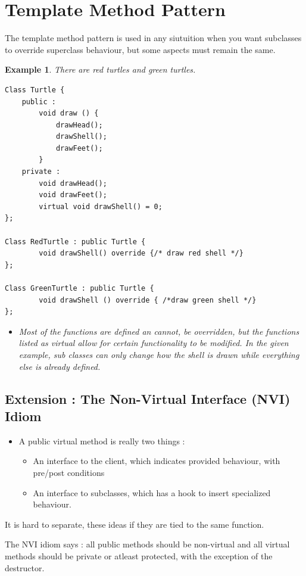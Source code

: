 \documentclass{article}
\newtheorem{ex}[theorem]{Example}
\begin{document}
\section{Template Method Pattern}
The template method pattern is used in any siutuition when you want subclasses to override superclass behaviour, but some aspects must remain the same. 

\begin{ex} There are red turtles and green turtles. 

\begin{lstlisting}
Class Turtle {
	public : 
		void draw () {
			drawHead();
			drawShell();
			drawFeet();
		}
	private : 
		void drawHead();
		void drawFeet();
		virtual void drawShell() = 0;
};

Class RedTurtle : public Turtle {
		void drawShell() override {/* draw red shell */}
};

Class GreenTurtle : public Turtle {
		void drawShell () override { /*draw green shell */}
};
\end{lstlisting}
\begin{itemize}
\item Most of the functions are defined an cannot, be overridden, but the functions listed as virtual allow for certain functionality to be modified. In the given example, sub classes can only change how the shell is drawn while everything else is already defined.
\end{itemize}
\end{ex}

\subsection{Extension : The Non-Virtual Interface (NVI) Idiom}
\begin{itemize}
\item A public virtual method is really two things :
\begin{itemize}
\item An interface to the client, which indicates provided behaviour, with pre/post conditions
\item An interface to subclasses, which has a hook to insert specialized behaviour.
\end{itemize}
\end{itemize}

It is hard to separate, these ideas if they are tied to the same function. 

The NVI idiom says : all public methods should be non-virtual and all virtual methods should be private or atleast protected, with the exception of the destructor. 
\end{document}
